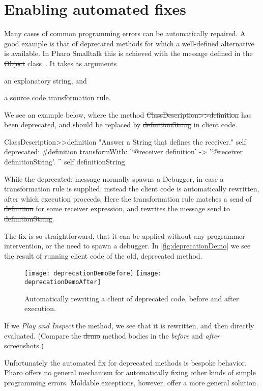 \documentclass[sigplan,anonymous,review,10pt]{acmart}
\begin{document}
\section{Enabling automated fixes}\label{sec:fixes}

Many cases of common programming errors can be automatically repaired.
A good example is that of deprecated methods for which a well-defined alternative is available.
In Pharo Smalltalk this is achieved with the  message defined in the \st{Object} class~\cite{Duca22a}.
It takes as arguments
\begin{inparaenum}[(i)]
	\item an explanatory string, and
	\item a source code transformation rule.
\end{inparaenum}
We see an example below, where the method \st{ClassDescription>>definition} has been deprecated, and should be replaced by \st{definitionString} in client code.
\begin{code}
ClassDescription>>definition
	"Answer a String that defines the receiver."
	self
		deprecated: #definition
		transformWith: '`@receiver definition' -> '`@receiver definitionString'.
	^ self definitionString
\end{code}
While the \st{deprecated:} message normally spawns a Debugger, in case a transformation rule is supplied, instead the client code is automatically rewritten, after which execution proceeds.
Here the transformation rule matches a send of \st{definition} for some receiver expression, and rewrites the message send to \st{definitionString}.

The fix is so straightforward, that it can be applied without any programmer intervention, or the need to spawn a debugger.
In \autoref{fig:deprecationDemo} we see the result of running client code of the old, deprecated method.
\begin{figure}[h]
  \texttt{[image: deprecationDemoBefore]}
  \texttt{[image: deprecationDemoAfter]}
  \caption{Automatically rewriting a client of deprecated code, before and after execution.}
  \label{fig:deprecationDemo}
\end{figure}
If we \emph{Play and Inspect} the method, we see that it is rewritten, and then directly evaluated.
(Compare the \st{demo} method bodies in the \emph{before} and \emph{after} screenshots.)

Unfortunately the automated fix for deprecated methods is bespoke behavior.
Pharo offers no general mechanism for automatically fixing other kinds of simple programming errors.
Moldable exceptions, however, offer a more general solution.
\end{document}
